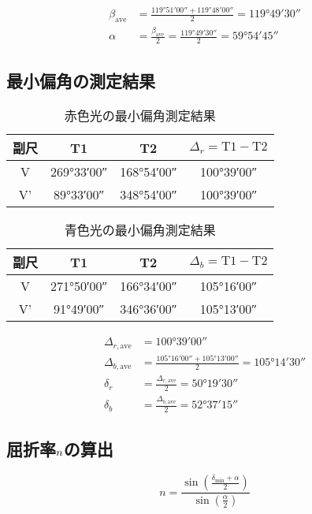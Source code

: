 \documentclass[a4paper,11pt,dvipdfmx]{jsarticle}
\begin{document}
\begin{align}
\beta_{\mathrm{ave}} &= \frac{\ang{119;51;00} + \ang{119;48;00}}{2} = \ang{119;49;30} \\
\alpha &= \frac{\beta_{\mathrm{ave}}}{2} = \frac{\ang{119;49;30}}{2} = \ang{59;54;45}
\end{align}

\subsection{最小偏角の測定結果}
\begin{table}[H]
\centering
\caption{赤色光の最小偏角測定結果}
\label{tab:red_light_measurement}
\begin{tabular}{|c|c|c|c|}
\hline
副尺 & T1 & T2 & $\Delta_r = \text{T1} - \text{T2}$ \\
\hline
V  & \ang{269;33;00} & \ang{168;54;00} & \ang{100;39;00} \\
\hline
V' & \ang{89;33;00}  & \ang{348;54;00} & \ang{100;39;00} \\
\hline
\end{tabular}
\end{table}

\begin{table}[H]
\centering
\caption{青色光の最小偏角測定結果}
\label{tab:blue_light_measurement}
\begin{tabular}{|c|c|c|c|}
\hline
副尺 & T1 & T2 & $\Delta_b = \text{T1} - \text{T2}$ \\
\hline
V  & \ang{271;50;00} & \ang{166;34;00} & \ang{105;16;00} \\
\hline
V' & \ang{91;49;00}  & \ang{346;36;00} & \ang{105;13;00} \\
\hline
\end{tabular}
\end{table}

\begin{align}
\Delta_{r,\mathrm{ave}} &= \ang{100;39;00} \\
\Delta_{b,\mathrm{ave}} &= \frac{\ang{105;16;00} + \ang{105;13;00}}{2} = \ang{105;14;30} \\
\delta_r &= \frac{\Delta_{r,\mathrm{ave}}}{2} = \ang{50;19;30} \\
\delta_b &= \frac{\Delta_{b,\mathrm{ave}}}{2} = \ang{52;37;15}
\end{align}

\subsection{屈折率$\boldmath n$の算出}
\begin{equation}
n = \frac{\sin\left(\frac{\delta_{\mathrm{min}} + \alpha}{2}\right)}{\sin\left(\frac{\alpha}{2}\right)}
\end{equation}
\end{document}
